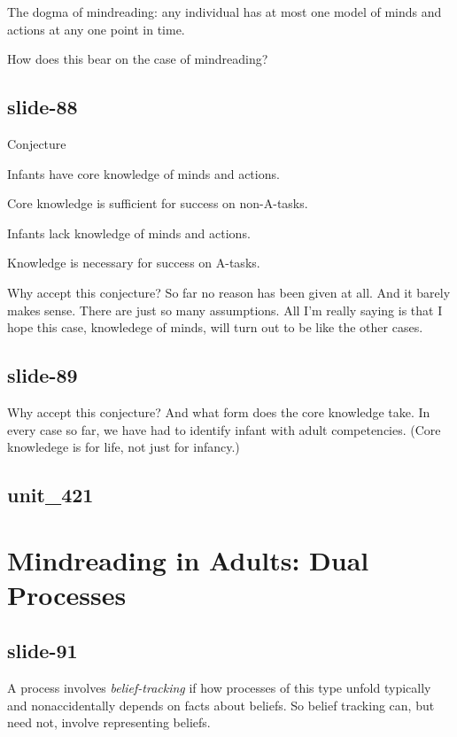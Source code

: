 \documentclass[12pt,\papersize]{extarticle}
\begin{document}
The dogma of mindreading: any individual has at most one model of minds and actions
at any one point in time.

How does this bear on the case of mindreading?

\subsection{slide-88}
Conjecture





Infants have core knowledge of minds and actions.



Core knowledge is sufficient for success on non-A-tasks.



Infants lack knowledge of minds and actions.



Knowledge is necessary for success on A-tasks.




Why accept this conjecture?
So far no reason has been given at all.
And it barely makes sense. There are just so many assumptions.
All I’m really saying is that I hope this case, knowledege of minds,
will turn out to be like the other cases.

\subsection{slide-89}
Why accept this conjecture?
And what form does the core knowledge take.
In every case so far, we have had to identify infant with adult competencies.
(Core knowledege is for life, not just for infancy.)

\subsection{unit\_421}


\section{Mindreading in Adults: Dual Processes}

\subsection{slide-91}
A process involves \emph{belief-tracking} if how processes of this type unfold
typically and nonaccidentally depends on facts about beliefs.
So belief tracking can, but need not, involve representing beliefs.
\end{document}
